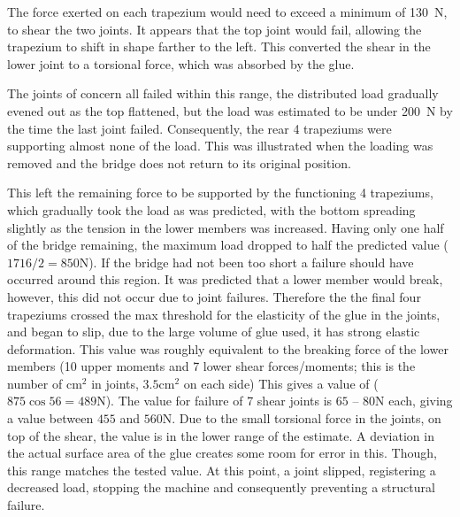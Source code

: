 \documentclass[12pt]{article}
\begin{document}
The force exerted on each trapezium would need to exceed a minimum of 130~N, to shear the two joints. It appears that the top joint would fail, allowing the trapezium to shift in shape farther to the left. This converted the shear in the lower joint to a torsional force, which was absorbed by the glue. 

The joints of concern all failed within this range, the distributed load gradually evened out as the top flattened, but the load was estimated to be under 200~N by the time the last joint failed. 
Consequently, the rear 4 trapeziums were supporting almost none of the load. This was illustrated when the loading was removed and the bridge does not return to its original position.

This left the remaining force to be supported by the functioning 4 trapeziums, which gradually took the load as was predicted, with the bottom spreading slightly as the tension in the lower members was increased. Having only one half of the bridge remaining, the maximum load dropped to half the predicted value ($1716 / 2 = 850\mathrm{N}$). If the bridge had not been too short a failure should have occurred around this region. It was predicted that a lower member would break, however, this did not occur due to joint failures. Therefore the the final four trapeziums crossed the max threshold for the elasticity of the glue in the joints, and began to slip, due to the large volume of glue used, it has strong elastic deformation. This value was roughly equivalent to the breaking force of the lower members (10 upper moments and 7 lower shear forces/moments; this is the number of $\mathrm{cm^2}$ in joints, $3.5 \mathrm{cm^2}$ on each side) This gives a value of ($875\cos 56 = 489\mathrm{N}$). The value for failure of 7 shear joints is $65$ -- $80\mathrm{N}$ each, giving a value between $455$ and $560\mathrm{N}$. Due to the small torsional force in the joints, on top of the shear, the value is in the lower range of the estimate. A deviation in the actual surface area of the glue creates some room for error in this. Though, this range matches the tested value.  At this point, a joint slipped, registering a decreased load, stopping the machine and consequently preventing a structural failure.
\clearpage

\clearpage
\end{document}
